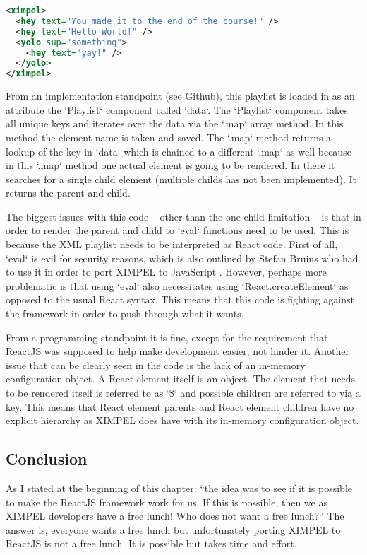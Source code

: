 \begin{lstlisting}[language=XML, caption=A toy playlist, label=playlist:ximpel_react]
<ximpel>
  <hey text="You made it to the end of the course!" />
  <hey text="Hello World!" />
  <yolo sup="something">
    <hey text="yay!" />
  </yolo>
</ximpel>
\end{lstlisting}

From an implementation standpoint (see Github), this playlist is loaded in as an attribute the `Playlist` component called `data`. The `Playlist` component takes all unique keys and iterates over the data via the `.map` array method. In this method the element name is taken and saved. The `.map` method returns a lookup of the key in `data` which is chained to a different `.map` as well because in this `.map` method one actual element is going to be rendered. In there it searches for a single child element (multiple childs has not been implemented). It returns the parent and child. 

The biggest issues with this code -- other than the one child limitation -- is that in order to render the parent and child to `eval` functions need to be used. This is because the XML playlist needs to be interpreted as React code. First of all, `eval` is evil for security reasons, which is also outlined by Stefan Bruins who had to use it in order to port XIMPEL to JavaScript \cite{stefan2016}. However, perhaps more problematic is that using `eval` also necessitates using `React.createElement` as opposed to the usual React syntax. This means that this code is fighting against the framework in order to push through what it wants. 

From a programming standpoint it is fine, except for the requirement that ReactJS was supposed to help make development easier, not hinder it. Another issue that can be clearly seen in the code is the lack of an in-memory configuration object. A React element itself is an object. The element that needs to be rendered itself is referred to as `\$` and possible children are referred to via a key. This means that React element parents and React element children have no explicit hierarchy as XIMPEL does have with its in-memory configuration object.

\subsection{Conclusion}
As I stated at the beginning of this chapter: ``the idea was to see if it is possible to make the ReactJS framework work for us. If this is possible, then we as XIMPEL developers have a free lunch! Who does not want a free lunch?`` The answer is, everyone wants a free lunch but unfortunately porting XIMPEL to ReactJS is not a free lunch. It is possible but takes time and effort. 

